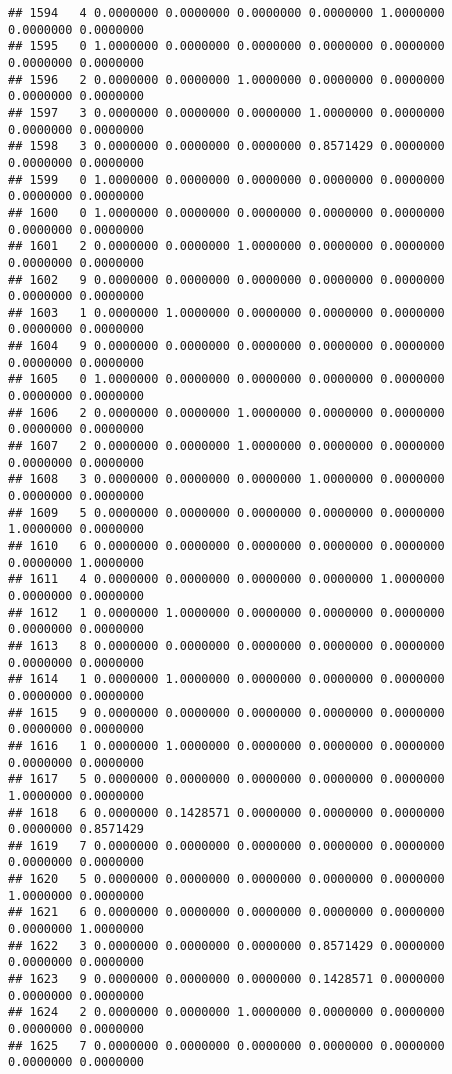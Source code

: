 \documentclass[
]{article}
\begin{document}
\begin{verbatim}
## 1594   4 0.0000000 0.0000000 0.0000000 0.0000000 1.0000000 0.0000000 0.0000000
## 1595   0 1.0000000 0.0000000 0.0000000 0.0000000 0.0000000 0.0000000 0.0000000
## 1596   2 0.0000000 0.0000000 1.0000000 0.0000000 0.0000000 0.0000000 0.0000000
## 1597   3 0.0000000 0.0000000 0.0000000 1.0000000 0.0000000 0.0000000 0.0000000
## 1598   3 0.0000000 0.0000000 0.0000000 0.8571429 0.0000000 0.0000000 0.0000000
## 1599   0 1.0000000 0.0000000 0.0000000 0.0000000 0.0000000 0.0000000 0.0000000
## 1600   0 1.0000000 0.0000000 0.0000000 0.0000000 0.0000000 0.0000000 0.0000000
## 1601   2 0.0000000 0.0000000 1.0000000 0.0000000 0.0000000 0.0000000 0.0000000
## 1602   9 0.0000000 0.0000000 0.0000000 0.0000000 0.0000000 0.0000000 0.0000000
## 1603   1 0.0000000 1.0000000 0.0000000 0.0000000 0.0000000 0.0000000 0.0000000
## 1604   9 0.0000000 0.0000000 0.0000000 0.0000000 0.0000000 0.0000000 0.0000000
## 1605   0 1.0000000 0.0000000 0.0000000 0.0000000 0.0000000 0.0000000 0.0000000
## 1606   2 0.0000000 0.0000000 1.0000000 0.0000000 0.0000000 0.0000000 0.0000000
## 1607   2 0.0000000 0.0000000 1.0000000 0.0000000 0.0000000 0.0000000 0.0000000
## 1608   3 0.0000000 0.0000000 0.0000000 1.0000000 0.0000000 0.0000000 0.0000000
## 1609   5 0.0000000 0.0000000 0.0000000 0.0000000 0.0000000 1.0000000 0.0000000
## 1610   6 0.0000000 0.0000000 0.0000000 0.0000000 0.0000000 0.0000000 1.0000000
## 1611   4 0.0000000 0.0000000 0.0000000 0.0000000 1.0000000 0.0000000 0.0000000
## 1612   1 0.0000000 1.0000000 0.0000000 0.0000000 0.0000000 0.0000000 0.0000000
## 1613   8 0.0000000 0.0000000 0.0000000 0.0000000 0.0000000 0.0000000 0.0000000
## 1614   1 0.0000000 1.0000000 0.0000000 0.0000000 0.0000000 0.0000000 0.0000000
## 1615   9 0.0000000 0.0000000 0.0000000 0.0000000 0.0000000 0.0000000 0.0000000
## 1616   1 0.0000000 1.0000000 0.0000000 0.0000000 0.0000000 0.0000000 0.0000000
## 1617   5 0.0000000 0.0000000 0.0000000 0.0000000 0.0000000 1.0000000 0.0000000
## 1618   6 0.0000000 0.1428571 0.0000000 0.0000000 0.0000000 0.0000000 0.8571429
## 1619   7 0.0000000 0.0000000 0.0000000 0.0000000 0.0000000 0.0000000 0.0000000
## 1620   5 0.0000000 0.0000000 0.0000000 0.0000000 0.0000000 1.0000000 0.0000000
## 1621   6 0.0000000 0.0000000 0.0000000 0.0000000 0.0000000 0.0000000 1.0000000
## 1622   3 0.0000000 0.0000000 0.0000000 0.8571429 0.0000000 0.0000000 0.0000000
## 1623   9 0.0000000 0.0000000 0.0000000 0.1428571 0.0000000 0.0000000 0.0000000
## 1624   2 0.0000000 0.0000000 1.0000000 0.0000000 0.0000000 0.0000000 0.0000000
## 1625   7 0.0000000 0.0000000 0.0000000 0.0000000 0.0000000 0.0000000 0.0000000

\end{verbatim}
\end{document}
